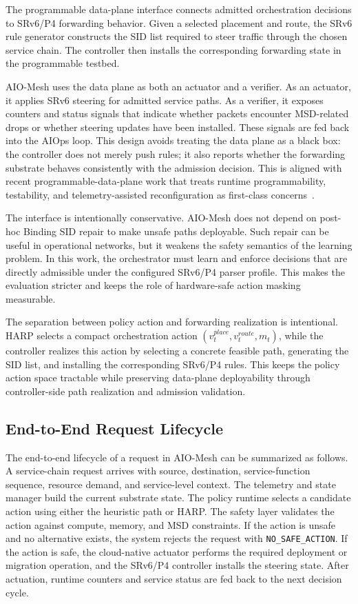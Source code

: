 \documentclass[final,5p]{elsarticle}
\begin{document}
The programmable data-plane interface connects admitted orchestration decisions to SRv6/P4 forwarding behavior. Given a selected placement and route, the SRv6 rule generator constructs the SID list required to steer traffic through the chosen service chain. The controller then installs the corresponding forwarding state in the programmable testbed.

AIO-Mesh uses the data plane as both an actuator and a verifier. As an actuator, it applies SRv6 steering for admitted service paths. As a verifier, it exposes counters and status signals that indicate whether packets encounter MSD-related drops or whether steering updates have been installed. These signals are fed back into the AIOps loop. This design avoids treating the data plane as a black box: the controller does not merely push rules; it also reports whether the forwarding substrate behaves consistently with the admission decision. This is aligned with recent programmable-data-plane work that treats runtime programmability, testability, and telemetry-assisted reconfiguration as first-class concerns~\cite{yang2024p4runpro,ruffy2023p4testgen,yan2024srv6int}.

The interface is intentionally conservative. AIO-Mesh does not depend on post-hoc Binding SID repair to make unsafe paths deployable. Such repair can be useful in operational networks, but it weakens the safety semantics of the learning problem. In this work, the orchestrator must learn and enforce decisions that are directly admissible under the configured SRv6/P4 parser profile. This makes the evaluation stricter and keeps the role of hardware-safe action masking measurable.

The separation between policy action and forwarding realization is intentional. HARP selects a compact orchestration action \((v^{place}_t,v^{route}_t,m_t)\), while the controller realizes this action by selecting a concrete feasible path, generating the SID list, and installing the corresponding SRv6/P4 rules. This keeps the policy action space tractable while preserving data-plane deployability through controller-side path realization and admission validation.

\subsection{End-to-End Request Lifecycle}
\label{subsec:request_lifecycle}

The end-to-end lifecycle of a request in AIO-Mesh can be summarized as follows. A service-chain request arrives with source, destination, service-function sequence, resource demand, and service-level context. The telemetry and state manager build the current substrate state. The policy runtime selects a candidate action using either the heuristic path or HARP. The safety layer validates the action against compute, memory, and MSD constraints. If the action is unsafe and no alternative exists, the system rejects the request with \texttt{NO\_SAFE\_ACTION}. If the action is safe, the cloud-native actuator performs the required deployment or migration operation, and the SRv6/P4 controller installs the steering state. After actuation, runtime counters and service status are fed back to the next decision cycle.
\end{document}
